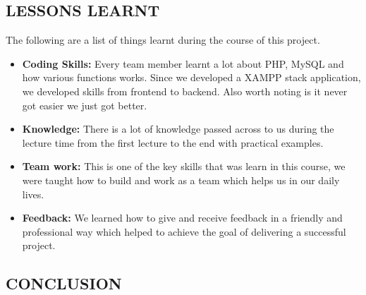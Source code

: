 \documentclass[12pt,a4paper]{article}
\begin{document}
	
	\subsection{LESSONS LEARNT}
	\begin{flushleft}
		The following are a list of things learnt during the course of this project.
		\begin{itemize}
		\item \textbf{Coding Skills:} Every team member learnt a lot about PHP, MySQL and how various functions works. Since we developed a XAMPP stack application, we developed skills from frontend to backend. Also worth noting is it never got easier we just got better.
		\item \textbf{Knowledge:} There is a lot of knowledge passed across to us during the lecture time from the first lecture to the end with practical examples.
		\item \textbf{Team work:} This is one of the key skills that was learn in this course, we were taught how to build and work as a
		team which helps us in our daily lives.
		\item \textbf{Feedback:} We learned how to give and receive feedback in a friendly and professional way which helped to achieve the goal of delivering a successful project.
		\end{itemize}
	\end{flushleft}
			
		
	\subsection{CONCLUSION}
	\begin{flushleft}
		
	\end{flushleft}
		
	
\end{document}
